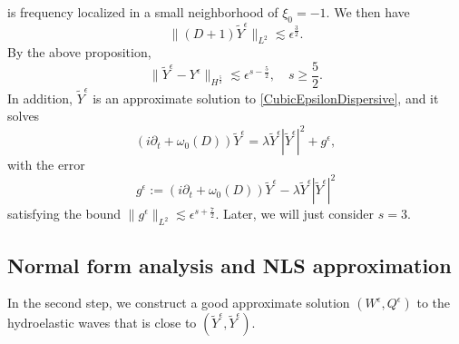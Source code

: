 \documentclass[12pt]{amsart}
\theoremstyle{remark}
\theoremstyle{definition}
\numberwithin{equation}{section}
\newcommand{\e}{\epsilon}
\newcommand{\f}{\frac}
\begin{document}
is frequency localized in a small neighborhood of $\xi_0=-1$.
We then have
\begin{equation*}
\|(D+1)\tilde{Y}^{\e}\|_{L^2}\lesssim \epsilon^\f32.
\end{equation*}
By the above proposition, 
\[
\| \tilde{Y}^\epsilon - Y^\epsilon \|_{H^{\frac{5}{2}}} \lesssim \epsilon^{s-\frac{5}{2}}, \quad s \geq \frac{5}{2}.
\]
In addition, $\tilde{Y}^\epsilon$ is an approximate solution to \eqref{CubicEpsilonDispersive}, and it solves 
\begin{equation} \label{TildeYEpsilon}
(i \partial_t + \omega_0(D)) \tilde{Y}^\epsilon = \lambda \tilde{Y}^\epsilon |\tilde{Y}^\epsilon|^2 + g^\epsilon,    
\end{equation}
with the error
\[
g^\epsilon := (i \partial_t + \omega_0(D)) \tilde{Y}^\epsilon - \lambda \tilde{Y}^\epsilon |\tilde{Y}^\epsilon|^2
\]
satisfying the bound $\| g^\epsilon \|_{L^2} \lesssim \epsilon^{s+\frac{7}{2}}$.
Later, we will just consider $s = 3$.

\subsection{Normal form analysis and NLS approximation}
In the second step, we construct a good approximate solution $(W^\e, Q^\e)$ to the hydroelastic waves that is close to $(\tilde{Y}^\epsilon, \tilde{Y}^\epsilon)$.
\end{document}
